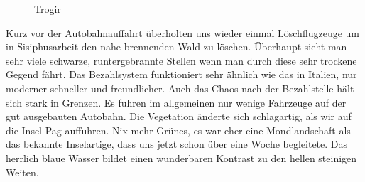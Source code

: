 \begin{figure}[H]
   \centering
   \quad
   \quad
   \quad
   \caption[Trogir]{Trogir}
\end{figure}

Kurz vor der Autobahnauffahrt überholten uns wieder einmal Löschflugzeuge um in Sisiphusarbeit den nahe brennenden Wald zu löschen.
Überhaupt sieht man sehr viele schwarze, runtergebrannte Stellen wenn man durch diese sehr trockene Gegend fährt.
Das Bezahlsystem funktioniert sehr ähnlich wie das in Italien, nur moderner schneller und freundlicher.
Auch das Chaos nach der Bezahlstelle hält sich stark in Grenzen.
Es fuhren im allgemeinen nur wenige Fahrzeuge auf der gut ausgebauten Autobahn.
Die Vegetation änderte sich schlagartig, als wir auf die Insel Pag auffuhren.
Nix mehr Grünes, es war eher eine Mondlandschaft als das bekannte Inselartige, dass uns jetzt schon über eine Woche begleitete.
Das herrlich blaue Wasser bildet einen wunderbaren Kontrast zu den hellen steinigen Weiten.

